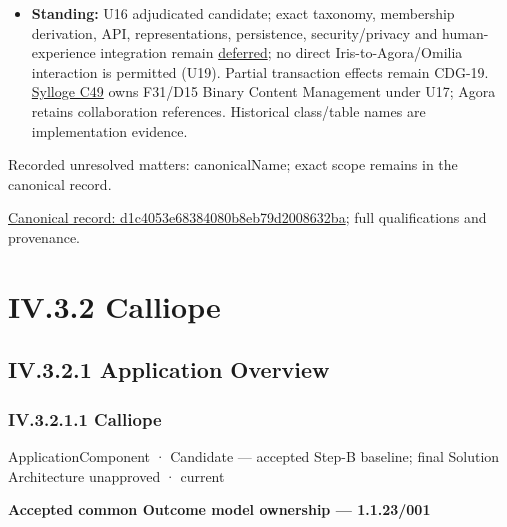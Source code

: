 \begin{itemize}
\item \textbf{Standing:} U16 adjudicated candidate; exact taxonomy, membership derivation,
  API, representations, persistence, security/privacy and human-experience
  integration remain \hyperref[element:d1c4053e68384080b8eb79d2008632ba]{deferred};
  no direct Iris-to-Agora/Omilia interaction is permitted (U19).
  Partial transaction effects remain CDG-19. \hyperref[element:feea742463b84021b66853d287d8916f]{Sylloge C49} owns F31/D15
  Binary Content Management under U17; Agora retains collaboration references.
  Historical class/table names are implementation evidence.

\end{itemize}

{\small Recorded unresolved matters: canonicalName; exact scope remains in the canonical record.}\par
{\footnotesize \href{../../../../continuum/application/application-component/d1c4053e68384080b8eb79d2008632ba.md}{Canonical record: d1c4053e68384080b8eb79d2008632ba}; full qualifications and provenance.}\par
\section*{IV.3.2 Calliope}
\label{navigation:IV.3.2}

\subsection*{IV.3.2.1 Application Overview}
\label{navigation:IV.3.2.1}

\subsubsection*{IV.3.2.1.1 Calliope}
\label{navigation:IV.3.2.1.1}

\label{element:466ad8f75a954c0581b5bba090443849}
{\small ApplicationComponent · Candidate — accepted Step-B baseline; final Solution Architecture unapproved · current}\par

\par\medskip\textbf{Accepted common Outcome model ownership — 1.1.23/001}\par


